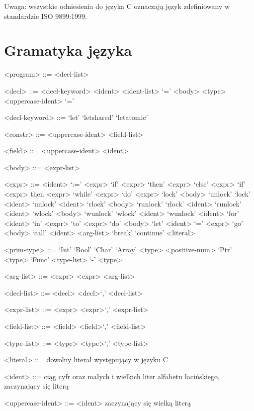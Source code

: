 \documentclass{documentation}
\begin{document}
Uwaga: wszystkie odniesienia do języka \textsc{C} oznaczają język zdefiniowany
w standardzie ISO 9899:1999.

\section{Gramatyka języka}
\begin{grammar}

<program> ::= <decl-list>

<decl> ::= <decl-keyword> <ident> <ident-list> `=' <body>
\alt <type> <uppercase-ident> `=' 

<decl-keyword> ::= `let'
\alt `letshared'
\alt `letatomic'

<constr> ::= <uppercase-ident> <field-list>

<field> ::= <uppercase-ident> <ident>

<body> ::= <expr-list>

<expr> ::= <ident> `:=' <expr>
\alt `if' <expr> `then' <expr> `else' <expr>
\alt `if' <expr> then <expr>
\alt `while' <expr> `do' <expr>
\alt `lock' <body> `unlock'
\alt `lock' <ident>
\alt `unlock' <ident>
\alt `rlock' <body> `runlock'
\alt `rlock' <ident>
\alt `runlock' <ident>
\alt `wlock' <body> `wunlock'
\alt `wlock' <ident>
\alt `wunlock' <ident>
\alt `for' <ident> `in' <expr> `to' <expr> `do' <body>
\alt `let' <ident> `=' <expr>
\alt `go' <body>
\alt `call' <ident> <arg-list>
\alt `break'
\alt `continue'
\alt <literal>

<prim-type> ::= `Int'
\alt `Bool'
\alt `Char'
\alt `Array' <type> <positive-num>
\alt `Ptr' <type>
\alt `Func' <type-list> `-\>' <type>

<arg-list> ::= <expr>
\alt <expr> <arg-list>

<decl-list> ::= <decl>
\alt <decl>`,' <decl-list>

<expr-list> ::= <expr>
\alt <expr>`,' <expr-list>

<field-list> ::= <field>
\alt <field>`,' <field-list>

<type-list> ::= <type>
\alt <type>`,' <type-list>

<literal> ::= dowolny literał występujący w języku C

<ident> ::= ciąg cyfr oraz małych i wielkich liter alfabetu łacińskiego, zaczynający się literą

<uppercase-ident> ::= <ident> zaczynający się wielką literą

\end{grammar}
\end{document}
